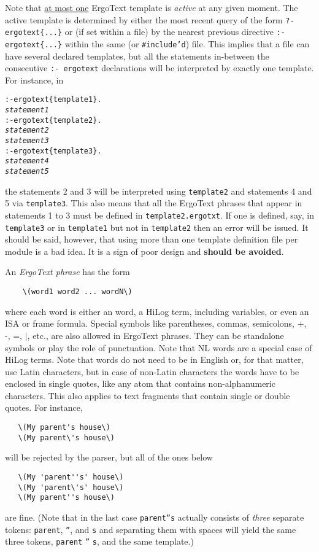 Note that \underline{at most one} ErgoText
  template is \emph{active}  at any given
moment. The active template is determined
by either the most recent query of the form \texttt{?-
  ergotext\{...\}} or (if set within a file) by the nearest previous directive
\texttt{:- ergotext\{...\}} within the same (or \texttt{\#include'd})  file.
This implies that a file can have several declared templates, but all the
statements in-between the consecutive \texttt{:- ergotext} declarations
will be interpreted by exactly one template. For instance, in
\begin{alltt}
   :- ergotext\{template1\}.
   \emph{statement1}  
   :- ergotext\{template2\}.
   \emph{statement2}  
   \emph{statement3}  
   :- ergotext\{template3\}.
   \emph{statement4}  
   \emph{statement5}  
\end{alltt}
the statements 2 and 3 will be interpreted using \texttt{template2} and
statements 4 and 5 via \texttt{template3}.
This also means that all the ErgoText
phrases that appear in statements 1 to 3 must be defined in
\texttt{template2.ergotxt}. If one is defined, say, in
\texttt{template3} or in \texttt{template1} but
not in \texttt{template2} then an error will be issued.
It should be said, however, that using more than one template definition file
per \ERGO module
is a bad idea. It is a sign of poor design and \textbf{should be avoided}.

An \emph{ErgoText phrase} has the form
\begin{verbatim}
    \(word1 word2 ... wordN\)
\end{verbatim}
where each word is either an word, a HiLog term, including
variables, or even an ISA or frame formula.
Special symbols like parentheses, commas,
semicolons, +, -, =, $\mid$, etc., are also allowed in ErgoText
phrases. They can be standalone symbols or play the role of punctuation.
Note that NL words are a special case of
HiLog terms. Note that words do not need to be in English or, for that
matter, use Latin characters, but in case of non-Latin characters the words
have to be enclosed in single
quotes, like any atom that contains non-alphanumeric characters.
This also applies to text fragments that contain single or double quotes.
For instance,
\begin{verbatim}
   \(My parent's house\)
   \(My parent\'s house\)
\end{verbatim}
will be rejected by the parser, but all of the ones below
\begin{verbatim}
   \(My 'parent''s' house\)
   \(My 'parent\'s' house\)
   \(My parent''s house\)
\end{verbatim}
are fine. (Note that in the last case \texttt{parent''s} actually consists
of \emph{three} separate tokens: \texttt{parent}, \texttt{''}, and
\texttt{s} and separating them with spaces will yield the same three tokens,
\texttt{parent} \texttt{''} \texttt{s}, and the same template.)

